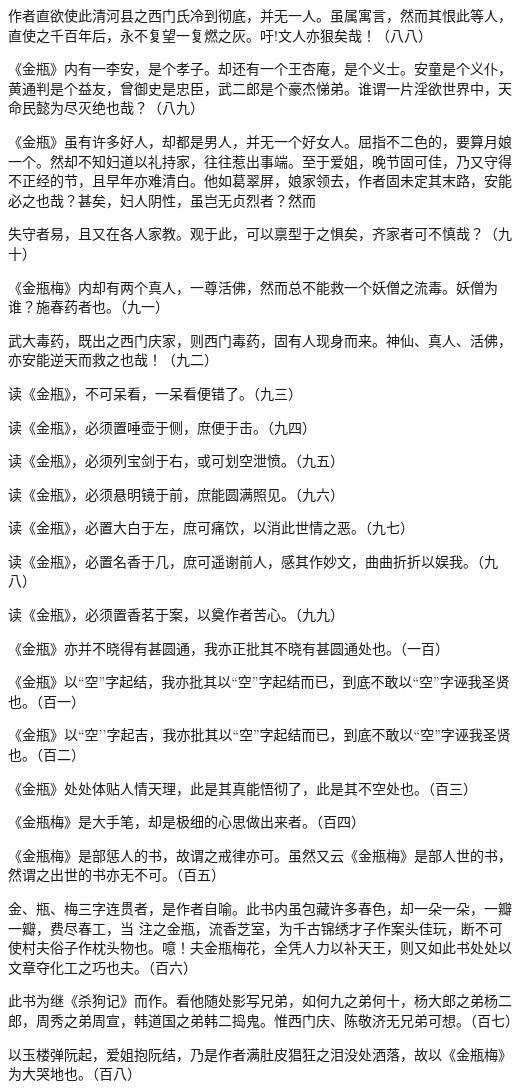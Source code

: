{作者直欲使此清河县之西门氏冷到彻底，并无一人。虽属寓言，然而其恨此等人，直使之千百年后，永不复望一复燃之灰。吁!文人亦狠矣哉！（八八）

《金瓶》内有一李安，是个孝子。却还有一个王杏庵，是个义士。安童是个义仆，黄通判是个益友，曾御史是忠臣，武二郎是个豪杰悌弟。谁谓一片淫欲世界中，天命民懿为尽灭绝也哉？（八九）

《金瓶》虽有许多好人，却都是男人，并无一个好女人。屈指不二色的，要算月娘一个。然却不知妇道以礼持家，往往惹出事端。至于爱姐，晚节固可佳，乃又守得不正经的节，且早年亦难清白。他如葛翠屏，娘家领去，作者固未定其末路，安能必之也哉？甚矣，妇人阴性，虽岂无贞烈者？然而

失守者易，且又在各人家教。观于此，可以禀型于之惧矣，齐家者可不慎哉？（九十）

《金瓶梅》内却有两个真人，一尊活佛，然而总不能救一个妖僧之流毒。妖僧为谁？施春药者也。（九一）

武大毒药，既出之西门庆家，则西门毒药，固有人现身而来。神仙、真人、活佛，亦安能逆天而救之也哉！（九二）

读《金瓶》，不可呆看，一呆看便错了。（九三）

读《金瓶》，必须置唾壶于侧，庶便于击。（九四）

读《金瓶》，必须列宝剑于右，或可划空泄愤。（九五）

读《金瓶》，必须悬明镜于前，庶能圆满照见。（九六）

读《金瓶》，必置大白于左，庶可痛饮，以消此世情之恶。（九七）

读《金瓶》，必置名香于几，庶可遥谢前人，感其作妙文，曲曲折折以娱我。（九八）

读《金瓶》，必须置香茗于案，以奠作者苦心。（九九）

《金瓶》亦并不晓得有甚圆通，我亦正批其不晓有甚圆通处也。（一百）

《金瓶》以“空”字起结，我亦批其以“空”字起结而已，到底不敢以“空”字诬我圣贤也。（百一）

《金瓶》以“空’’字起吉，我亦批其以“空”字起结而已，到底不敢以“空”字诬我圣贤也。（百二）

《金瓶》处处体贴人情天理，此是其真能悟彻了，此是其不空处也。（百三）

《金瓶梅》是大手笔，却是极细的心思做出来者。（百四）

《金瓶梅》是部惩人的书，故谓之戒律亦可。虽然又云《金瓶梅》是部人世的书，然谓之出世的书亦无不可。（百五）

金、瓶、梅三字连贯者，是作者自喻。此书内虽包藏许多春色，却一朵一朵，一瓣一瓣，费尽春工，当
注之金瓶，流香芝室，为千古锦绣才子作案头佳玩，断不可使村夫俗子作枕头物也。噫！夫金瓶梅花，全凭人力以补天王，则又如此书处处以文章夺化工之巧也夫。（百六）

此书为继《杀狗记》而作。看他随处影写兄弟，如何九之弟何十，杨大郎之弟杨二郎，周秀之弟周宣，韩道国之弟韩二捣鬼。惟西门庆、陈敬济无兄弟可想。（百七）

以玉楼弹阮起，爱姐抱阮结，乃是作者满肚皮猖狂之泪没处洒落，故以《金瓶梅》为大哭地也。（百八）

} %


